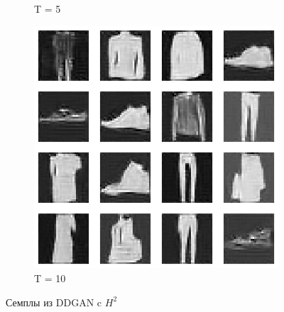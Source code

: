 \documentclass{article}
\begin{document}
\begin{figure}[H]
\begin{subfigure}[h]{0.3\linewidth}
		\caption{T = 5}
	\end{subfigure}
	\hfill
	\begin{subfigure}[h]{0.3\linewidth}
		\centering
		\includegraphics[scale=0.3]{../code/generated_DDGAN_h2_10.png}
		\caption{T = 10}
	\end{subfigure}
	\caption{Семплы из DDGAN c $H^2$}\label{ddgan_h2_samples}	
\end{figure}
\end{document}

